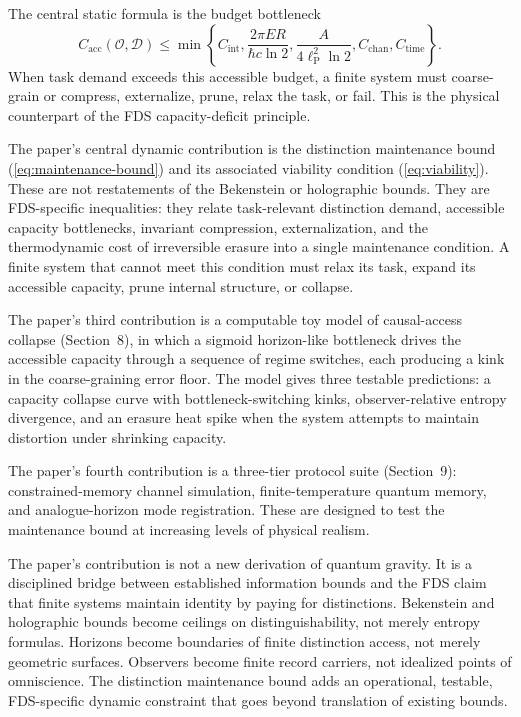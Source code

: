 \documentclass[10pt,a4paper,twocolumn,aps,prl]{revtex4-2}
\newcommand{\Obs}{\mathcal{O}}
\newcommand{\Patch}{\mathcal{D}}
\newcommand{\ellP}{\ell_{\mathrm P}}
\begin{document}
The central static formula is the budget bottleneck
\begin{equation}
C_{\mathrm{acc}}(\Obs,\Patch)
\leq
\min\left\{
C_{\mathrm{int}},
\frac{2\pi ER}{\hbar c\ln2},
\frac{A}{4\ellP^2\ln2},
C_{\mathrm{chan}},
C_{\mathrm{time}}
\right\}.
\end{equation}
When task demand exceeds this accessible budget, a finite system must coarse-grain or compress, externalize, prune, relax the task, or fail. This is the physical counterpart of the FDS capacity-deficit principle.

The paper's central dynamic contribution is the distinction maintenance bound (\ref{eq:maintenance-bound}) and its associated viability condition (\ref{eq:viability}). These are not restatements of the Bekenstein or holographic bounds. They are FDS-specific inequalities: they relate task-relevant distinction demand, accessible capacity bottlenecks, invariant compression, externalization, and the thermodynamic cost of irreversible erasure into a single maintenance condition. A finite system that cannot meet this condition must relax its task, expand its accessible capacity, prune internal structure, or collapse.

The paper's third contribution is a computable toy model of causal-access collapse (Section~8), in which a sigmoid horizon-like bottleneck drives the accessible capacity through a sequence of regime switches, each producing a kink in the coarse-graining error floor. The model gives three testable predictions: a capacity collapse curve with bottleneck-switching kinks, observer-relative entropy divergence, and an erasure heat spike when the system attempts to maintain distortion under shrinking capacity.

The paper's fourth contribution is a three-tier protocol suite (Section~9): constrained-memory channel simulation, finite-temperature quantum memory, and analogue-horizon mode registration. These are designed to test the maintenance bound at increasing levels of physical realism.

The paper's contribution is not a new derivation of quantum gravity. It is a disciplined bridge between established information bounds and the FDS claim that finite systems maintain identity by paying for distinctions. Bekenstein and holographic bounds become ceilings on distinguishability, not merely entropy formulas. Horizons become boundaries of finite distinction access, not merely geometric surfaces. Observers become finite record carriers, not idealized points of omniscience. The distinction maintenance bound adds an operational, testable, FDS-specific dynamic constraint that goes beyond translation of existing bounds.
\end{document}
